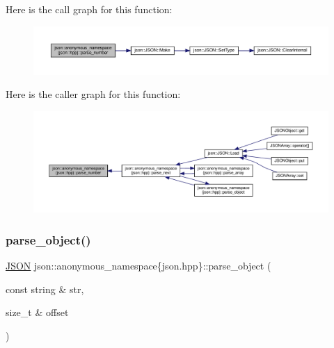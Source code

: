 Here is the call graph for this function\+:
\nopagebreak
\begin{figure}[H]
\begin{center}
\leavevmode
\includegraphics[width=350pt]{namespacejson_1_1anonymous__namespace_02json_8hpp_03_a9cc81652562c9d3c0f639ce43057f09a_cgraph}
\end{center}
\end{figure}
Here is the caller graph for this function\+:
\nopagebreak
\begin{figure}[H]
\begin{center}
\leavevmode
\includegraphics[width=350pt]{namespacejson_1_1anonymous__namespace_02json_8hpp_03_a9cc81652562c9d3c0f639ce43057f09a_icgraph}
\end{center}
\end{figure}
\mbox{\label{namespacejson_1_1anonymous__namespace_02json_8hpp_03_a69b6c8f8bb93130f5c6dab832000f915}} 
\subsubsection{\texorpdfstring{parse\+\_\+object()}{parse\_object()}}
{\footnotesize\ttfamily \mbox{\hyperlink{classjson_1_1_j_s_o_n}{J\+S\+ON}} json\+::anonymous\+\_\+namespace\{json.\+hpp\}\+::parse\+\_\+object (\begin{DoxyParamCaption}\item[{const string \&}]{str,  }\item[{size\+\_\+t \&}]{offset }\end{DoxyParamCaption})}



